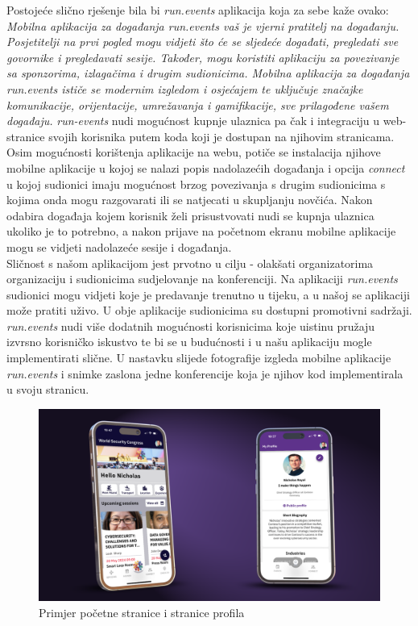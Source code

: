 		Postojeće slično rješenje bila bi \textit{run.events} aplikacija koja za sebe kaže ovako: \textit{Mobilna aplikacija za događanja run.events vaš je vjerni pratitelj na događanju. Posjetitelji na prvi pogled mogu vidjeti što će se sljedeće događati, pregledati sve govornike i pregledavati sesije. Također, mogu koristiti aplikaciju za povezivanje sa sponzorima, izlagačima i drugim sudionicima. Mobilna aplikacija za događanja run.events ističe se modernim izgledom i osjećajem te uključuje značajke komunikacije, orijentacije, umrežavanja i gamifikacije, sve prilagođene vašem događaju.}
		\textit{run-events} nudi mogućnost kupnje ulaznica pa čak i integraciju u web-stranice svojih korisnika putem koda koji je dostupan na njihovim stranicama. Osim mogućnosti korištenja aplikacije na webu, potiče se instalacija njihove mobilne aplikacije u kojoj se nalazi popis nadolazećih događanja i opcija \textit{connect} u kojoj sudionici imaju mogućnost brzog povezivanja s drugim sudionicima s kojima onda mogu razgovarati ili se natjecati u skupljanju novčića. Nakon odabira događaja kojem korisnik želi prisustvovati nudi se kupnja ulaznica ukoliko je to potrebno, a nakon prijave na početnom ekranu mobilne aplikacije mogu se vidjeti nadolazeće sesije i događanja.\\
		
		Sličnost s našom aplikacijom jest prvotno u cilju - olakšati organizatorima organizaciju i sudionicima sudjelovanje na konferenciji. Na aplikaciji \textit{run.events} sudionici mogu vidjeti koje je predavanje trenutno u tijeku, a u našoj se aplikaciji može pratiti uživo. U obje aplikacije sudionicima su dostupni promotivni sadržaji. \textit{run.events} nudi više dodatnih mogućnosti korisnicima koje uistinu pružaju izvrsno korisničko iskustvo te bi se u budućnosti i u našu aplikaciju mogle implementirati slične. U nastavku slijede fotografije izgleda mobilne aplikacije \textit{run.events} i snimke zaslona jedne konferencije koja je njihov kod implementirala u svoju stranicu.\\
		
		\begin{figure}[ht]
			\centering
			\includegraphics[width=1\linewidth]{slike/runevents-homeandprofile.png}
			\caption{Primjer početne stranice i stranice profila}
			\label{fig:home-profile}
		\end{figure}
		

